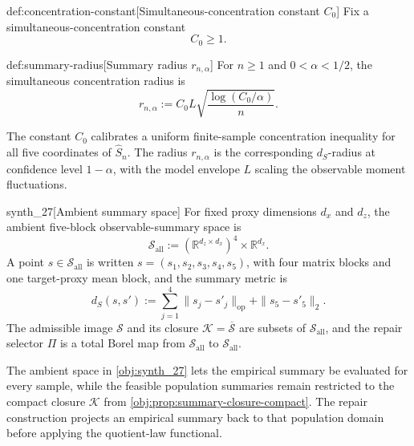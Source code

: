 \documentclass[11pt]{article}
\begin{document}
\begin{definitionv}{def:concentration-constant}[Simultaneous-concentration constant \(C_0\)]
Fix a simultaneous-concentration constant
\[
C_0\ge 1.
\]
\end{definitionv}

\begin{definitionv}{def:summary-radius}[Summary radius \(r_{n,\alpha}\)]
For \(n\ge 1\) and \(0<\alpha<1/2\), the simultaneous concentration radius is
\[
r_{n,\alpha}
:=
C_0L\sqrt{\frac{\log(C_0/\alpha)}{n}}.
\]
\end{definitionv}

The constant \(C_0\) calibrates a uniform finite-sample concentration inequality for all five coordinates of \(\widehat S_n\). The radius \(r_{n,\alpha}\) is the corresponding \(d_S\)-radius at confidence level \(1-\alpha\), with the model envelope \(L\) scaling the observable moment fluctuations.

\begin{definitionv}{synth_27}[Ambient summary space]
For fixed proxy dimensions \(d_x\) and \(d_z\), the ambient five-block observable-summary space is
\[
\mathscr S_{\mathrm{all}}
:=
(\mathbb R^{d_z\times d_x})^4\times\mathbb R^{d_x}.
\]
A point \(s\in\mathscr S_{\mathrm{all}}\) is written \(s=(s_1,s_2,s_3,s_4,s_5)\), with four matrix blocks and one target-proxy mean block, and the summary metric is
\[
d_S(s,s'):=\sum_{j=1}^{4}\|s_j-s'_j\|_{\mathrm{op}}+\|s_5-s'_5\|_2 .
\]
The admissible image \(\mathscr S\) and its closure \(\mathcal K=\overline{\mathscr S}\) are subsets of \(\mathscr S_{\mathrm{all}}\), and the repair selector \(\Pi\) is a total Borel map from \(\mathscr S_{\mathrm{all}}\) to \(\mathscr S_{\mathrm{all}}\).
\end{definitionv}

The ambient space in \cref{obj:synth_27} lets the empirical summary be evaluated for every sample, while the feasible population summaries remain restricted to the compact closure \(\mathcal K\) from \cref{obj:prop:summary-closure-compact}. The repair construction projects an empirical summary back to that population domain before applying the quotient-law functional.
\end{document}
